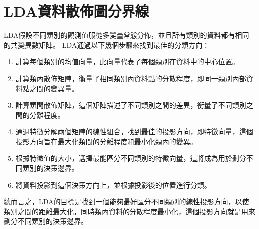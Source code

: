 \documentclass[12pt, a4paper]{article}
\begin{document}
\section{LDA資料散佈圖分界線}
LDA假設不同類別的觀測值服從多變量常態分佈，並且所有類別的資料都有相同的共變異數矩陣。
LDA通過以下幾個步驟來找到最佳的分類方向\;：
\begin{enumerate}
\item 計算每個類別的均值向量，此向量代表了每個類別在資料中的中心位置。
\item 計算類內散佈矩陣，衡量了相同類別內資料點的分散程度，即同一類別內部資料點之間的變異量。
\item 計算類間散佈矩陣，這個矩陣描述了不同類別之間的差異，衡量了不同類別之間的分離程度。
\item 通過特徵分解兩個矩陣的線性組合，找到最佳的投影方向，即特徵向量，這個投影方向旨在最大化類間的分離程度和最小化類內的變異。
\item 根據特徵值的大小，選擇最能區分不同類別的特徵向量，這將成為用於劃分不同類別的決策邊界。
\item 將資料投影到這個決策方向上，並根據投影後的位置進行分類。
\end{enumerate}
總而言之，LDA的目標是找到一個能夠最好區分不同類別的線性投影方向，以使類別之間的距離最大化，同時類內資料的分散程度最小化，這個投影方向就是用來劃分不同類別的決策邊界。
\end{document}

